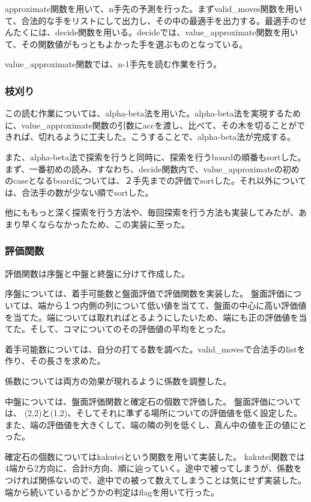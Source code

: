 \documentclass[uplatex,12pt]{jsarticle}
\begin{document}
approximate関数を用いて、n手先の予測を行った。まずvalid\_moves関数を用いて、合法的な手をリストにして出力し、その中の最適手を出力する。最適手のせんたくには、decide関数を用いる。decideでは、value\_approximate関数を用いて、その関数値がもっともよかった手を選ぶものとなっている。

value\_approximate関数では、n-1手先を読む作業を行う。

\subsubsection{枝刈り}
この読む作業については、alpha-beta法を用いた。alpha-beta法を実現するために、value\_approximate関数の引数にaccを渡し、比べて、その木を切ることができれば、切れるように工夫した。こうすることで、alpha-beta法が完成する。

また、alpha-beta法で探索を行うと同時に、探索を行うboardの順番もsortした。まず、一番初めの読み、すなわち、decide関数内で、value\_approximateの初めのcaseとなるboardについては、２手先までの評価でsortした。それ以外については、合法手の数が少ない順でsortした。

他にももっと深く探索を行う方法や、毎回探索を行う方法も実装してみたが、あまり早くならなかったため、この実装に至った。

\subsubsection{評価関数}
評価関数は序盤と中盤と終盤に分けて作成した。

序盤については、着手可能数と盤面評価で評価関数を実装した。
盤面評価については、端から１つ内側の列について低い値を当てて、盤面の中心に高い評価値を当てた。端については取れればとるようにしたいため、端にも正の評価値を当てた。そして、コマについてのその評価値の平均をとった。

着手可能数については、自分の打てる数を調べた。valid\_movesで合法手のlistを作り、その長さを求めた。

係数については両方の効果が現れるように係数を調整した。

\vspace{12pt}

中盤については、盤面評価関数と確定石の個数で評価した。
盤面評価については、
(2,2)と(1,2)、そしてそれに準ずる場所についての評価値を低く設定した。また、端の評価値を大きくして、端の隣の列を低くし、真ん中の値を正の値にとった。

確定石の個数についてはkakuteiという関数を用いて実装した。
kakutei関数では4端から2方向に、合計8方向、順に辿っていく。途中で被ってしまうが、係数をつければ関係ないので、途中での被って数えてしまうことは気にせず実装した。端から続いているかどうかの判定はflagを用いて行った。
\end{document}
